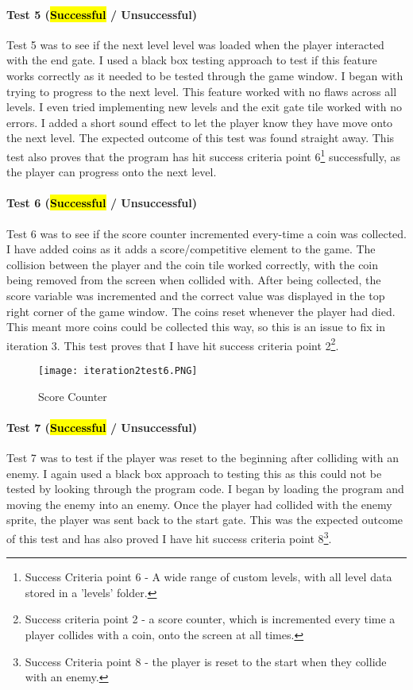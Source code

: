 \documentclass[12pt]{report}
\begin{document}
\paragraph{Test 5 (\hl{Successful} / Unsuccessful)}
Test 5 was to see if the next level level was loaded when the player interacted with the end gate. I used a black box testing approach to test if this feature works correctly as it needed to be tested through the game window. I began with trying to progress to the next level. This feature worked with no flaws across all levels. I even tried implementing new levels and the exit gate tile worked with no errors. I added a short sound effect to let the player know they have move onto the next level. The expected outcome of this test was found straight away. This test also proves that the program has hit success criteria point 6\footnote{Success Criteria point 6 - A wide range of custom levels, with all level data stored in a ’levels’ folder.} successfully, as the player can progress onto the next level. 

\paragraph{Test 6 (\hl{Successful} / Unsuccessful)}
Test 6 was to see if the score counter incremented every-time a coin was collected. I have added coins as it adds a score/competitive element to the game. The collision between the player and the coin tile worked correctly, with the coin being removed from the screen when collided with. After being collected, the score variable was incremented and the correct value was displayed in the top right corner of the game window. The coins reset whenever the player had died. This meant more coins could be collected this way, so this is an issue to fix in iteration 3. This test proves that I have hit success criteria point 2\footnote{ Success criteria point 2 - a score counter, which is incremented every time a player collides with a coin, onto the screen at all times.}. 

\begin{figure}[H]
    \centering
    \texttt{[image: iteration2test6.PNG]}
    \caption{Score Counter}
\end{figure}

\pagebreak

\paragraph{Test 7 (\hl{Successful} / Unsuccessful)}
Test 7 was to test if the player was reset to the beginning after colliding with an enemy. I again used a black box approach to testing this as this could not be tested by looking through the program code. I began by loading the program and moving the enemy into an enemy. Once the player had collided with the enemy sprite, the player was sent back to the start gate. This was the expected outcome of this test and has also proved I have hit success criteria point 8\footnote{Success Criteria point 8 - the player is reset to the start when they collide with an enemy.}.
\end{document}
